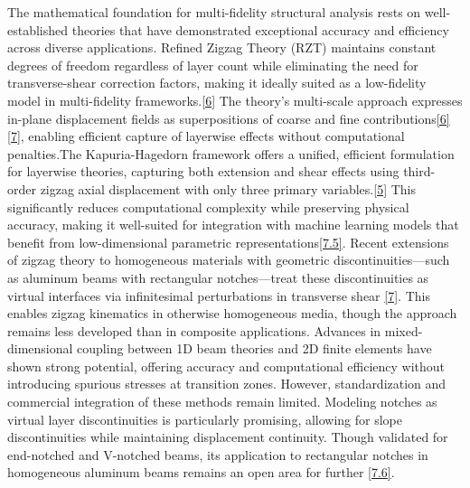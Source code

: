 \documentclass[12pt,a4paper]{report}
\begin{document}
The mathematical foundation for multi-fidelity structural analysis rests on well-established theories that have demonstrated exceptional accuracy and efficiency across diverse applications. Refined Zigzag Theory (RZT) maintains constant degrees of freedom regardless of layer count while eliminating the need for transverse-shear correction factors, making it ideally suited as a low-fidelity model in multi-fidelity frameworks.\href{https://ntrs.nasa.gov/citations/20090007494}{[6]} The theory's multi-scale approach expresses in-plane displacement fields as superpositions of coarse and fine contributions\href{https://ntrs.nasa.gov/citations/20090007494}{[6]}\href{https://ntrs.nasa.gov/citations/20100013955}{[7]}, enabling efficient capture of layerwise effects without computational penalties.The Kapuria-Hagedorn framework offers a unified, efficient formulation for layerwise theories, capturing both extension and shear effects using third-order zigzag axial displacement with only three primary variables.\href{http://dx.doi.org/10.2140/jomms.2007.2.1267}{[5]} This significantly reduces computational complexity while preserving physical accuracy, making it well-suited for integration with machine learning models that benefit from low-dimensional parametric representations\href{https://www.sciencedirect.com/science/article/pii/S0045793018304250}{[7.5]}.
Recent extensions of zigzag theory to homogeneous materials with geometric discontinuities—such as aluminum beams with rectangular notches—treat these discontinuities as virtual interfaces via infinitesimal perturbations in transverse shear \href{https://ntrs.nasa.gov/citations/20100013955}{[7]}. This enables zigzag kinematics in otherwise homogeneous media, though the approach remains less developed than in composite applications.
Advances in mixed-dimensional coupling between 1D beam theories and 2D finite elements have shown strong potential, offering accuracy and computational efficiency without introducing spurious stresses at transition zones. However, standardization and commercial integration of these methods remain limited.
Modeling notches as virtual layer discontinuities is particularly promising, allowing for slope discontinuities while maintaining displacement continuity. Though validated for end-notched and V-notched beams, its application to rectangular notches in homogeneous aluminum beams remains an open area for further \href{https://www.sciencedirect.com/science/article/pii/S0022460X24000774}{[7.6]}.
\end{document}
